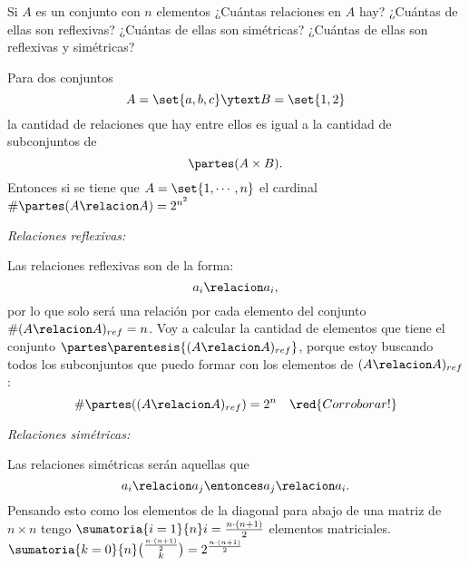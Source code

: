 \begin{enunciado}{\ejercicio}
  Si $A$ es un conjunto con $n$ elementos ¿Cuántas relaciones en $A$ hay?
  ¿Cuántas de ellas son reflexivas?
  ¿Cuántas de  ellas son simétricas? ¿Cuántas de ellas son reflexivas y simétricas? \\
\end{enunciado}

Para dos conjuntos
$$
  A = \set{a,b,c}
  \ytext
  B = \set{1,2}
$$
la cantidad de relaciones que hay entre ellos es igual a la cantidad de subconjuntos de
$$
  \partes(A \times B).
$$
Entonces si se tiene que $A = \set{1,\cdots, n}$ el cardinal $\# \partes(A \relacion A ) = 2^{n^2}$

\bigskip

\textit{Relaciones reflexivas:}

Las relaciones reflexivas son de la forma:
$$
  a_i \relacion a_i,
$$
por lo que solo será una relación por cada elemento del conjunto $\# (A \relacion A)_{ref} = n$.
Voy a calcular la cantidad de elementos que tiene el conjunto
$\partes \parentesis{ (A \relacion A)_{ref} }$, porque estoy buscando todos los subconjuntos que puedo
formar con los elementos de $(A \relacion A)_{ref}$:
$$
  \#\partes((A \relacion A)_{ref}) = 2^n
  \quad\red{Corroborar!}
$$

\bigskip

\textit{Relaciones simétricas:}

Las relaciones simétricas serán aquellas que
$$
  a_i \relacion a_j \entonces a_j \relacion a_i.
$$
Pensando esto como los elementos de la diagonal
para abajo de una matriz de $n\times n$ tengo $\sumatoria{i=1}{n} i = \frac{n \cdot (n+1)}{2}$ elementos matriciales.\\
$\sumatoria{k = 0}{n} \binom{\frac{n \cdot (n+1)}{2}}{k} = 2^{\frac{n \cdot (n+1)}{2}}$

